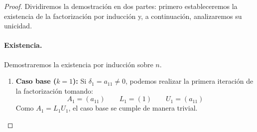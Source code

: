 \begin{proof}
    Dividiremos la demostración en dos partes: primero estableceremos la existencia de la factorización por inducción y, a continuación, analizaremos su unicidad.

    \paragraph{Existencia.} Demostraremos la existencia por inducción sobre $n$.
    
    \begin{enumerate}
        \item \textbf{Caso base ($k=1$):} Si $\delta_1 = a_{11} \neq 0$, podemos realizar la primera iteración de la factorización tomando:
        \[
            A_1 = (a_{11}) \qquad L_1 = (1) \qquad U_1 = (a_{11})
        \]
        Como $A_1 = L_1 U_1$, el caso base se cumple de manera trivial.


\end{enumerate}
\end{proof}
